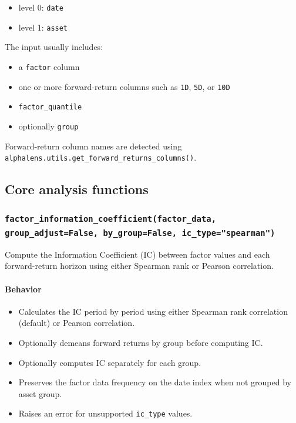 \documentclass[11pt]{article}
\begin{document}
\begin{itemize}
  \item level 0: \texttt{date}
  \item level 1: \texttt{asset}
\end{itemize}

The input usually includes:

\begin{itemize}
  \item a \texttt{factor} column
  \item one or more forward-return columns such as \texttt{1D}, \texttt{5D}, or \texttt{10D}
  \item \texttt{factor\_quantile}
  \item optionally \texttt{group}
\end{itemize}

Forward-return column names are detected using \texttt{alphalens.utils.get\_forward\_returns\_columns()}.

\subsection{Core analysis functions}

\subsubsection{\texttt{factor\_information\_coefficient(factor\_data, group\_adjust=False, by\_group=False, ic\_type="spearman")}}
Compute the Information Coefficient (IC) between factor values and each forward-return horizon using either Spearman rank or Pearson correlation.

\paragraph{Behavior}
\begin{itemize}
  \item Calculates the IC period by period using either Spearman rank correlation (default) or Pearson correlation.
  \item Optionally demeans forward returns by group before computing IC.
  \item Optionally computes IC separately for each group.
  \item Preserves the factor data frequency on the date index when not grouped by asset group.
  \item Raises an error for unsupported \texttt{ic\_type} values.
\end{itemize}
\end{document}
